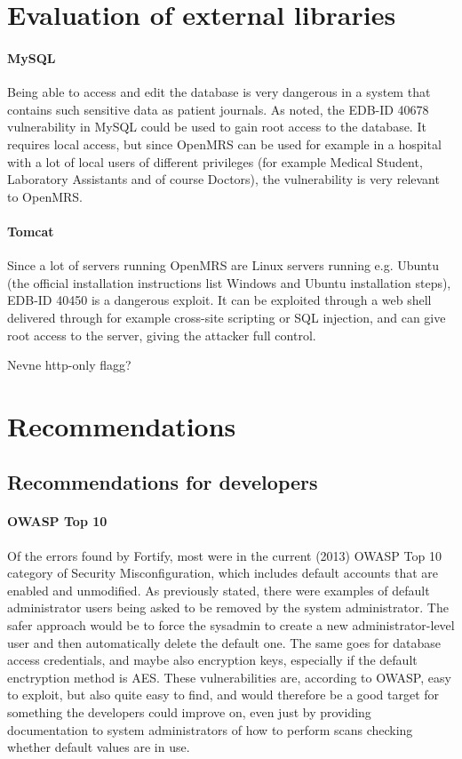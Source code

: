 \documentclass{report} %
\begin{document}
\section{Evaluation of external libraries}
\paragraph{MySQL}
Being able to access and edit the database is very dangerous in a system that
contains such sensitive data as patient journals.
As noted, the EDB-ID 40678 vulnerability in MySQL could be used to gain root
access to the database. It requires local access, but since OpenMRS can be used
for example in a hospital with a lot of local users of different privileges (for
example Medical Student, Laboratory Assistants and of course Doctors), the
vulnerability is very relevant to OpenMRS. 

\paragraph{Tomcat}
Since a lot of servers running OpenMRS are Linux servers running e.g. Ubuntu
(the official installation instructions list Windows and Ubuntu installation
steps), EDB-ID 40450 is a dangerous exploit. It can be exploited through a web
shell delivered through for example cross-site scripting or SQL injection, and
can give root access to the server, giving the attacker full control.

Nevne http-only flagg?

\section{Recommendations}

\subsection{Recommendations for developers}

\paragraph{OWASP Top 10}
Of the errors found by Fortify, most were in the current (2013) OWASP Top 10
category of Security Misconfiguration, which includes default accounts that are
enabled and unmodified. As previously stated, there were examples of default
administrator users being asked to be removed by the system administrator. The
safer approach would be to force the sysadmin to create a new
administrator-level user and then automatically delete the default one. The same
goes for database access credentials, and maybe also encryption keys, especially
if the default enctryption method is AES. These vulnerabilities are, according to OWASP,
easy to exploit, but also quite easy to find, and would therefore be a good
target for something the developers could improve on, even just by providing
documentation to system administrators of how to perform scans checking whether
default values are in use.
\end{document}
